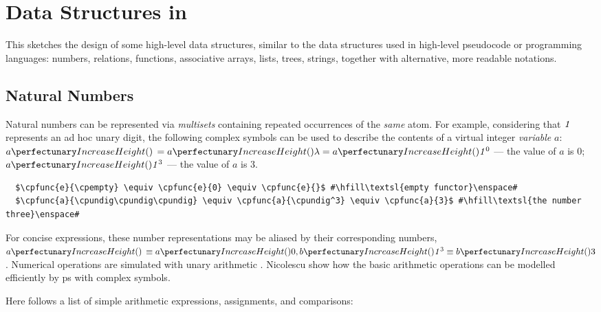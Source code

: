 \section{Data Structures in }\label{sec:cps:datastructures}

This  sketches the design of some high-level data structures, 
similar to the data structures used in high-level pseudocode or %
programming languages:
numbers, relations, functions, associative arrays, lists, trees, strings, 
together with alternative, more readable notations.

\subsection{\label{sec:cps:natnums}Natural Numbers}
Natural numbers can be represented via \emph{multisets} containing repeated occurrences of the \emph{same} atom.
For example, considering that \(\mathit{1}\) represents an ad hoc unary digit, 
the following complex symbols can be used to describe 
the contents of a virtual integer \emph{variable} \(a\): 
\(\cpfunc{a}{\,} = \cpfunc{a}{\cpempty} = \cpfunc{a}{\cpundig^0}\) --- the value of \(a\) is 0;
\(\cpfunc{a}{\cpundig^3}\) --- the value of \(a\) is 3.

\lstset{xleftmargin=.5in, xrightmargin=.5in} 
\begin{lstlisting}
  $\cpfunc{e}{\cpempty} \equiv \cpfunc{e}{0} \equiv \cpfunc{e}{}$ #\hfill\textsl{empty functor}\enspace#
  $\cpfunc{a}{\cpundig\cpundig\cpundig} \equiv \cpfunc{a}{\cpundig^3} \equiv \cpfunc{a}{3}$ #\hfill\textsl{the number three}\enspace#
\end{lstlisting}

For concise expressions, these number representations may be aliased by their corresponding numbers, \eg{}~\(\cpfunc{a}{\,} \equiv \cpfunc{a}{0}, \cpfunc{b}{\cpundig^3} \equiv \cpfunc{b}{3}\).  Numerical operations are simulated with unary arithmetic \cite{Aman2019,Bonchis2006}.
Nicolescu \etal{} \cite{Nicolescu2014,RN-HW-ROMJIST14} show how the basic arithmetic operations can be modelled efficiently by \gls{ps} with complex symbols.

Here follows a list of simple arithmetic expressions, assignments, and comparisons:

